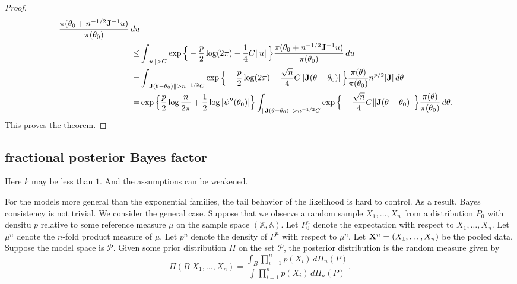 \documentclass[3p]{elsarticle}
\theoremstyle{plain}
\theoremstyle{definition}
\theoremstyle{remark}
\begin{document}
\begin{proof}
$$\begin{aligned}
\frac{\pi(\theta_0+n^{-1/2} \BJ^{-1}u)}{\pi(\theta_0)}\, du
\\
    \leq & 
    \int_{\|u\|> C}
\exp\Big\{
-\frac{p}{2}\log (2\pi)
    -\frac{1}{4} C\|u\|
    \Big\}
\frac{\pi(\theta_0+n^{-1/2} \BJ^{-1}u)}{\pi(\theta_0)}\, du\\
    = & 
    \int_{\|\BJ(\theta-\theta_0)\|>n^{-1/2} C}
\exp\Big\{
-\frac{p}{2}\log (2\pi)
    -\frac{\sqrt{n}}{4} C\|\BJ(\theta-\theta_0)\|
    \Big\}
\frac{\pi(\theta)}{\pi(\theta_0)} n^{p/2} |\BJ| \, d\theta\\
    = & 
\exp\Big\{
    \frac{p}{2}\log \frac{n}{2\pi}
    +\frac{1}{2}\log |\psi''(\theta_0)|
    \Big\}
    \int_{\|\BJ(\theta-\theta_0)\|>n^{-1/2} C}
    \exp\Big\{
    -\frac{\sqrt{n}}{4} C\|\BJ(\theta-\theta_0)\|
    \Big\}
\frac{\pi(\theta)}{\pi(\theta_0)} \, d\theta.
\end{aligned}
$$
This proves the theorem.
\end{proof}


\subsection{fractional posterior Bayes factor}
{\color{red}
Here $k$ may be less than $1$.
And the assumptions can be weakened.
}

For the models more general than the exponential families, the tail behavior of the likelihood is hard to control.
As a result, Bayes consistency is not trivial.
We consider the general case.
Suppose that we observe a random sample $X_1,\ldots, X_n$ from a distribution $P_0$ with densitu $p$ relative to some reference measure $\mu$ on the sample space $(\mathbb{X},\mathbb{A})$. 
Let $P_0^n$ denote the expectation with respect to $X_1,\ldots, X_n$. 
Let $\mu^n$ denote the $n$-fold product measure of $\mu$.
Let $p^n$ denote the density of $P^n$ with respect to $\mu^n$.
Let $\mathbf{X}^n=(X_1,\ldots, X_n)$ be the pooled data.
Suppose the model space is $\mathcal{P}$.
Given some prior distribution $\Pi$ on the set $\mathcal{P}$, the posterior distribution is the random measure given by
\begin{equation}\label{eq:BayesFormula}
\Pi(B|X_1,\ldots, X_n)=\frac{
    \int_B \prod_{i=1}^n p(X_i) \, d \Pi_n(P)
}{
    \int \prod_{i=1}^n p(X_i) \, d \Pi_n(P)
}.
\end{equation}
\end{document}
